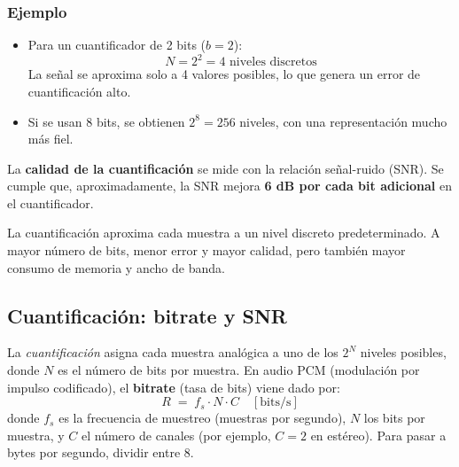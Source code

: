 \documentclass[11pt,a4paper]{article}
\begin{document}
\subsubsection*{Ejemplo}
\begin{itemize}
  \item Para un cuantificador de 2 bits ($b=2$):
  \[
  N = 2^2 = 4 \text{ niveles discretos}
  \]
  La señal se aproxima solo a 4 valores posibles, lo que genera un error de cuantificación alto.
  \item Si se usan 8 bits, se obtienen $2^8 = 256$ niveles, con una representación mucho más fiel.
\end{itemize}

\begin{NotaBox}
La \textbf{calidad de la cuantificación} se mide con la relación señal-ruido (SNR).
Se cumple que, aproximadamente, la SNR mejora \textbf{6 dB por cada bit adicional} en el cuantificador.
\end{NotaBox}

\begin{ResumenBox}
La cuantificación aproxima cada muestra a un nivel discreto predeterminado.
A mayor número de bits, menor error y mayor calidad, pero también mayor consumo de memoria y ancho de banda.
\end{ResumenBox}

\subsection{Cuantificación: bitrate y SNR}

La \emph{cuantificación} asigna cada muestra analógica a uno de los $2^N$ niveles
posibles, donde $N$ es el número de bits por muestra. En audio PCM (modulación por
impulso codificado), el \textbf{bitrate} (tasa de bits) viene dado por:
\begin{equation}
  R \;=\; f_s \cdot N \cdot C \quad [\text{bits/s}]
\end{equation}
donde $f_s$ es la frecuencia de muestreo (muestras por segundo),
$N$ los bits por muestra, y $C$ el número de canales (por ejemplo, $C=2$ en estéreo).
Para pasar a bytes por segundo, dividir entre 8.
\end{document}
